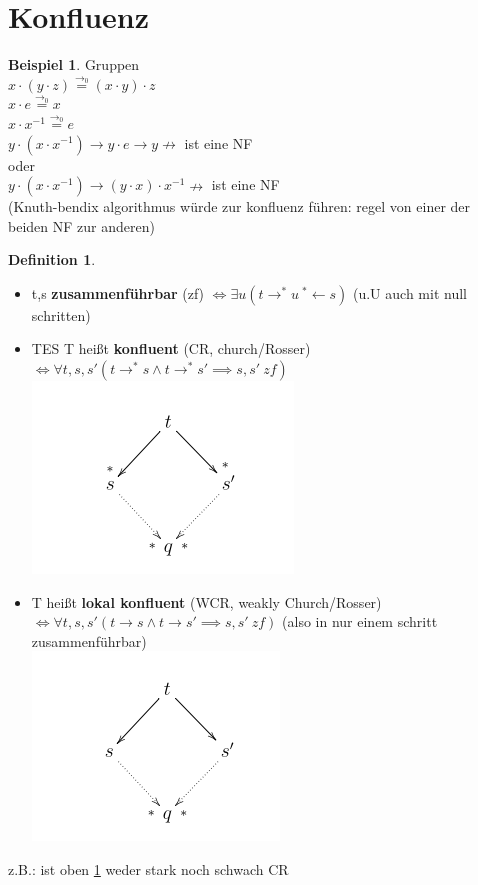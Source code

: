 \documentclass{article}
\newcommand{\nto}{\nrightarrow}
\theoremstyle{definition}
\newtheorem{beispiel}{Beispiel}[section]
\newtheorem{definition}{Definition}[section]
\begin{document}
	\section{Konfluenz}
	\begin{beispiel} Gruppen\label{gruppen}\\
		$x\cdot (y\cdot z)\stackrel{\to_0}{=} (x\cdot y)\cdot z$\\
		$x\cdot e \stackrel{\to_0}{=} x$\\
		$x\cdot x^{-1} \stackrel{\to_0}{=} e$\\
		$y\cdot (x\cdot x^{-1})\to y\cdot e\to y\nto$ ist eine NF\\
		oder\\
		$y\cdot (x\cdot x^{-1})\to (y\cdot x)\cdot x^{-1}\nto$ ist eine NF\\
		(Knuth-bendix algorithmus\cite{knuthBendix} würde zur konfluenz führen: regel von einer der beiden NF zur anderen)\\
	\end{beispiel}
	\begin{definition}\ \\
	\begin{itemize}
		\item t,s \textbf{zusammenführbar} (zf) $\iff \exists u(t\to^*u\ ^*\gets s)$ (u.U auch mit null schritten)
		\item TES T heißt \textbf{konfluent} (CR, church/Rosser) $\iff \forall t,s,s' (t\to^* s\land t\to^* s'\implies s,s'\ zf)$\\
		\includegraphics[scale=0.5]{images/konfluenzDiamant.png}
		\item T heißt \textbf{lokal konfluent} (WCR, weakly Church/Rosser) $\iff \forall t,s,s' (t\to s\land t\to s'\implies s,s'\ zf)$ (also in nur einem schritt zusammenführbar)\\
		\includegraphics[scale=0.5]{images/WeaklyChurchRosser.png}
	\end{itemize}
	z.B.: ist oben \ref{gruppen} weder stark noch schwach CR
	\end{definition}
\end{document}
